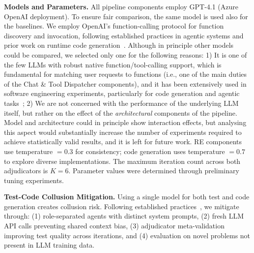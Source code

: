 \documentclass[sigconf,screen]{acmart}
\begin{document}
\textbf{Models and Parameters.} All pipeline components employ GPT-4.1 (Azure OpenAI deployment). To ensure fair comparison, the same model is used also for the baselines.
We employ OpenAI's function-calling protocol for function discovery and invocation, following established practices in agentic systems and prior work on runtime code generation~\cite{fahim2026selfevolve}. Although in principle other models could be compared, we selected only one for the following reasons: 1) It is one of the few LLMs  with robust native function/tool-calling support, which is fundamental for matching user requests to functions (i.e., one of the main duties of the Chat \& Tool Dispatcher components), and it has been extensively used in software engineering experiments, particularly for code generation and agentic tasks~\cite{jiang2026survey,zhang2026survey}; 2) We are not concerned with the performance of the underlying LLM itself, but rather on the effect of the \textit{architectural} components of the pipeline. Model and architecture could in principle show interaction effects, but analysing this aspect would substantially increase the number of experiments required to achieve statistically valid results, and it is left for future work.
RE components use temperature $= 0.3$ for consistency; code generation uses temperature $= 0.7$ to explore diverse implementations. The maximum iteration count across both adjudicators is $K = 6$. Parameter values were determined through preliminary tuning experiments.

\textbf{Test-Code Collusion Mitigation.} Using a single model for both test and code generation creates collusion risk. Following established practices~\cite{huang2024agentcoder,dong2024selfcollaboration,fahim2026selfevolve}, we mitigate through: (1) role-separated agents with distinct system prompts, (2) fresh LLM API calls preventing shared context bias,
(3) adjudicator meta-validation improving test quality across iterations,
and (4) evaluation on novel problems not present in LLM training data.
\end{document}
